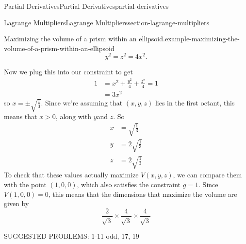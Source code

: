 \documentclass[oneside,10pt,]{book}
\numberwithin{equation}{section}
\begin{document}
\begin{chapterptx}{Partial Derivatives}{}{Partial Derivatives}{}{}{partial-derivatives}
\begin{sectionptx}{Lagrange Multipliers}{}{Lagrange Multipliers}{}{}{section-lagrange-multipliers}
\begin{example}{Maximizing the volume of a prism within an ellipsoid.}{example-maximizing-the-volume-of-a-prism-within-an-ellipsoid}
\begin{equation*}
y^{2} = z^{2} = 4x^{2}.
\end{equation*}
%
\par
\hypertarget{p-1458}{}%
Now we plug this into our constraint to get%
\begin{align*}
1 & = x^{2} + \frac{y^{2}}{4} + \frac{z^{2}}{4} = 1 \\
& = 3x^{2} 
\end{align*}
so \(x = \pm\sqrt{\frac{1}{3}}\). Since we're assuming that \((x,y,z)\) lies in the first octant, this means that \(x > 0\), along with \(y \)and \(z\). So%
\begin{align*}
x & = \sqrt{\frac{1}{3}} \\
y & = 2\sqrt{\frac{1}{3}} \\
z & = 2\sqrt{\frac{1}{3}} 
\end{align*}
To check that these values actually maximize \(V(x,y,z)\), we can compare them with the point \((1,0,0)\), which also satisfies the constraint \(g = 1\). Since \(V(1,0,0) = 0\), this means that the dimensions that maximize the volume are given by%
\begin{equation*}
\frac{2}{\sqrt{3}}\times\frac{4}{\sqrt{3}}\times\frac{4}{\sqrt{3}}
\end{equation*}
%
\end{example}
\hypertarget{p-1459}{}%
SUGGESTED PROBLEMS: 1-11 odd, 17, 19%
\end{sectionptx}
\end{chapterptx}
%
%
\typeout{************************************************}
\typeout{************************************************}
%
\end{document}
